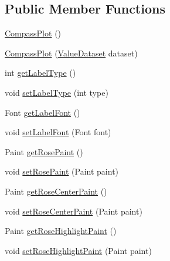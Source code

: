 \subsection*{Public Member Functions}
\begin{DoxyCompactItemize}
\item 
\mbox{\hyperlink{classorg_1_1jfree_1_1chart_1_1plot_1_1_compass_plot_a5aafde9f4d437b3ccc77ed0c6f916c97}{Compass\+Plot}} ()
\item 
\mbox{\hyperlink{classorg_1_1jfree_1_1chart_1_1plot_1_1_compass_plot_afe691c5bd4d16ee00abd6506c9a1994f}{Compass\+Plot}} (\mbox{\hyperlink{interfaceorg_1_1jfree_1_1data_1_1general_1_1_value_dataset}{Value\+Dataset}} dataset)
\item 
int \mbox{\hyperlink{classorg_1_1jfree_1_1chart_1_1plot_1_1_compass_plot_a39f33f879528d43e4597f3038cf0eab5}{get\+Label\+Type}} ()
\item 
void \mbox{\hyperlink{classorg_1_1jfree_1_1chart_1_1plot_1_1_compass_plot_a5ab37f95ad344e28b5f78f4d61443b48}{set\+Label\+Type}} (int type)
\item 
Font \mbox{\hyperlink{classorg_1_1jfree_1_1chart_1_1plot_1_1_compass_plot_a0b53e720564c3d6b745d25244fc55752}{get\+Label\+Font}} ()
\item 
void \mbox{\hyperlink{classorg_1_1jfree_1_1chart_1_1plot_1_1_compass_plot_af688b26ccadd9c7c02e8976b1f07fa41}{set\+Label\+Font}} (Font font)
\item 
Paint \mbox{\hyperlink{classorg_1_1jfree_1_1chart_1_1plot_1_1_compass_plot_ad70a4293a0a4a9998726fbcb110c581d}{get\+Rose\+Paint}} ()
\item 
void \mbox{\hyperlink{classorg_1_1jfree_1_1chart_1_1plot_1_1_compass_plot_acf31acd8f0bb61bbab25e161c2e98768}{set\+Rose\+Paint}} (Paint paint)
\item 
Paint \mbox{\hyperlink{classorg_1_1jfree_1_1chart_1_1plot_1_1_compass_plot_a750f550a147200d68f767c7cd367876e}{get\+Rose\+Center\+Paint}} ()
\item 
void \mbox{\hyperlink{classorg_1_1jfree_1_1chart_1_1plot_1_1_compass_plot_a2fc72d27007f0762ae9c6dd6af65e971}{set\+Rose\+Center\+Paint}} (Paint paint)
\item 
Paint \mbox{\hyperlink{classorg_1_1jfree_1_1chart_1_1plot_1_1_compass_plot_a555cfe75f1011e0e8bcd236a6fc865aa}{get\+Rose\+Highlight\+Paint}} ()
\item 
void \mbox{\hyperlink{classorg_1_1jfree_1_1chart_1_1plot_1_1_compass_plot_a4b63fbf468b95ed64c3e139bf74a365b}{set\+Rose\+Highlight\+Paint}} (Paint paint)
\item 

\end{DoxyCompactItemize}
